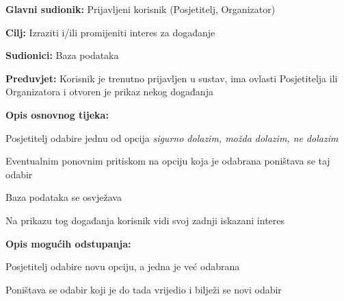 					
					
					\noindent {}
					\begin{packed_item}
						
						\item \textbf{Glavni sudionik:} Prijavljeni korisnik (Posjetitelj, Organizator)
						\item  \textbf{Cilj:} Izraziti i/ili promijeniti interes za događanje
						\item  \textbf{Sudionici:} Baza podataka
						\item  \textbf{Preduvjet:} Korisnik je trenutno prijavljen u sustav, ima ovlasti Posjetitelja ili Organizatora i otvoren je  prikaz nekog događanja 
						\item  \textbf{Opis osnovnog tijeka:}
						
						\item[] \begin{packed_enum}
							
							\item Posjetitelj odabire jednu od opcija \textit{sigurno dolazim, možda dolazim, ne dolazim }
							\item Eventualnim ponovnim pritiskom na opciju koja je odabrana poništava se taj odabir
							\item Baza podataka se osvježava
							\item Na prikazu tog događanja korisnik vidi svoj zadnji iskazani interes 
							
						\end{packed_enum}
						
						\item  \textbf{Opis mogućih odstupanja:}
						
						\item[] \begin{packed_item}
							
							\item[1.a] Posjetitelj odabire novu opciju, a jedna je već odabrana  
							\item[] \begin{packed_enum}
								
								\item Poništava se odabir koji je do tada vrijedio i bilježi se novi odabir
								
							\end{packed_enum}		
						\end{packed_item}
						
					\end{packed_item}
					
